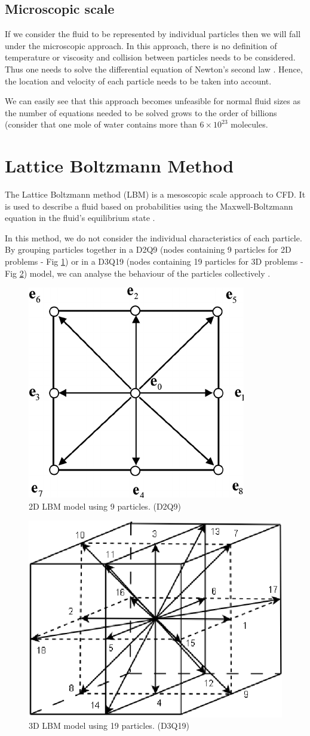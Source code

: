 \documentclass[12pt]{book}
\begin{document}
\subsection{Microscopic scale}
If we consider the fluid to be represented by individual particles then we will fall under the microscopic approach. In this approach, there is no definition of temperature or viscosity and collision between particles needs to be considered. Thus one needs to solve the differential equation of Newton’s second law \cite{lbm_springer}. Hence, the location and velocity of each particle needs to be taken into account.
	\par We can easily see that this approach becomes unfeasible for normal fluid sizes as the number of equations needed to be solved grows to the order of billions (consider that one mole of water contains more than $6 \times 10^{23}$ molecules.


\section{Lattice Boltzmann Method}
The Lattice Boltzmann method (LBM) is a mesoscopic scale approach to CFD. It is used to describe a fluid based on probabilities using the Maxwell-Boltzmann equation in the fluid’s equilibrium state \cite{lbm_springer}. 
\par In this method, we do not consider the individual characteristics of each particle. By grouping particles together in a D2Q9 (nodes containing 9 particles for 2D problems - Fig \ref{fig:d2q9})  or in a D3Q19 (nodes containing 19 particles for 3D problems - Fig \ref{fig:d3q19}) model, we can analyse the behaviour of the particles collectively  \cite{lbm_springer}. 

\begin{figure}[H]
\centering
  \includegraphics[width=0.3\linewidth]{Resources/Images/d2q9.png}
  \caption{2D LBM model using 9 particles. (D2Q9)}
  \label{fig:d2q9}
\end{figure}

\begin{figure}[H]
\centering
  \includegraphics[width=0.3\linewidth]{Resources/Images/d3q19.png}
  \caption{3D LBM model using 19 particles. (D3Q19)}
  \label{fig:d3q19}
\end{figure}
\end{document}
